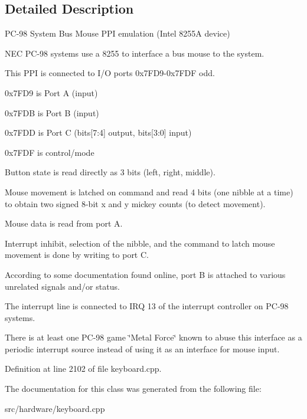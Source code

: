\subsection{Detailed Description}
P\-C-\/98 System Bus Mouse P\-P\-I emulation (Intel 8255\-A device) 

N\-E\-C P\-C-\/98 systems use a 8255 to interface a bus mouse to the system.

This P\-P\-I is connected to I/\-O ports 0x7\-F\-D9-\/0x7\-F\-D\-F odd.
\begin{DoxyItemize}
\item 0x7\-F\-D9 is Port A (input)
\item 0x7\-F\-D\-B is Port B (input)
\item 0x7\-F\-D\-D is Port C (bits\mbox{[}7\-:4\mbox{]} output, bits\mbox{[}3\-:0\mbox{]} input)
\item 0x7\-F\-D\-F is control/mode
\end{DoxyItemize}

Button state is read directly as 3 bits (left, right, middle).

Mouse movement is latched on command and read 4 bits (one nibble at a time) to obtain two signed 8-\/bit x and y mickey counts (to detect movement).

Mouse data is read from port A.

Interrupt inhibit, selection of the nibble, and the command to latch mouse movement is done by writing to port C.

According to some documentation found online, port B is attached to various unrelated signals and/or status.

The interrupt line is connected to I\-R\-Q 13 of the interrupt controller on P\-C-\/98 systems.

There is at least one P\-C-\/98 game \char`\"{}\-Metal Force\char`\"{} known to abuse this interface as a periodic interrupt source instead of using it as an interface for mouse input. 

Definition at line 2102 of file keyboard.\-cpp.



The documentation for this class was generated from the following file\-:\begin{DoxyCompactItemize}
\item 
src/hardware/keyboard.\-cpp\end{DoxyCompactItemize}
